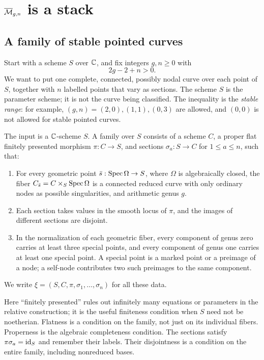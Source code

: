 \chapter{\texorpdfstring{$\overline{\mathcal M}_{g,n}$}{Stable pointed curves} is a stack}\label{ch:curves}

\section{A family of stable pointed curves}

Start with a scheme $S$ over $\mathbb C$, and fix integers $g,n\geq0$ with
\begin{equation}\label{eq:stable-range}
                         2g-2+n>0.
\end{equation}
We want to put one complete, connected, possibly nodal curve over each
point of $S$, together with $n$ labelled points that vary as sections.
The scheme $S$ is the parameter scheme; it is not the curve being
classified. The inequality is the \emph{stable range}: for example,
$(g,n)=(2,0),(1,1),(0,3)$ are allowed, and $(0,0)$ is not allowed
for stable pointed curves.

\begin{Def}\label{def:stable-family}
The input is a $\mathbb C$-scheme $S$. A family over $S$ consists of a scheme
$C$, a proper flat finitely presented morphism $\pi:C\to S$, and
sections $\sigma_a:S\to C$ for $1\leq a\leq n$, such that:
\begin{enumerate}
\item For every geometric point $\bar s:\operatorname{Spec}\Omega\to S$, where
$\Omega$ is algebraically closed, the fiber
$C_{\bar s}=C\times_S\operatorname{Spec}\Omega$ is a connected reduced curve with
only ordinary nodes as possible singularities, and arithmetic genus
$g$.
\item Each section takes values in the smooth locus of $\pi$, and the
images of different sections are disjoint.
\item In the normalization of each geometric fiber, every component
of genus zero carries at least three special points, and every
component of genus one carries at least one special point. A special
point is a marked point or a preimage of a node; a self-node contributes
two such preimages to the same component.
\end{enumerate}
We write $\xi=(S,C,\pi,\sigma_1,\ldots,\sigma_n)$ for all these data.
\end{Def}

Here ``finitely presented'' rules out infinitely many equations or
parameters in the relative construction; it is the useful finiteness
condition when $S$ need not be noetherian. Flatness is a condition on
the family, not just on its individual fibers. Properness is the
algebraic completeness condition. The sections satisfy
$\pi\sigma_a=\operatorname{id}_S$ and remember their labels. Their disjointness is
a condition on the entire family, including nonreduced bases.

